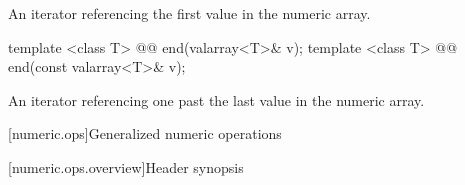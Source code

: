 \begin{itemdescr}
\pnum
\returns An iterator referencing the first value in the numeric array.
\end{itemdescr}

%
%
\begin{itemdecl}
template <class T> @@ end(valarray<T>& v);
template <class T> @@ end(const valarray<T>& v);
\end{itemdecl}

\begin{itemdescr}
\pnum
\returns An iterator referencing one past the last value in the numeric array.
\end{itemdescr}


[numeric.ops]{Generalized numeric operations}

[numeric.ops.overview]{Header  synopsis}

